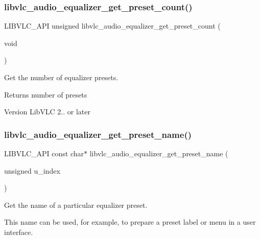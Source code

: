 \subsubsection{\texorpdfstring{libvlc\+\_\+audio\+\_\+equalizer\+\_\+get\+\_\+preset\+\_\+count()}{libvlc\_audio\_equalizer\_get\_preset\_count()}}
{\footnotesize\ttfamily L\+I\+B\+V\+L\+C\+\_\+\+A\+PI unsigned libvlc\+\_\+audio\+\_\+equalizer\+\_\+get\+\_\+preset\+\_\+count (\begin{DoxyParamCaption}\item[{void}]{ }\end{DoxyParamCaption})}

Get the number of equalizer presets.

\begin{DoxyReturn}{Returns}
number of presets 
\end{DoxyReturn}
\begin{DoxyVersion}{Version}
Lib\+V\+LC 2.. or later 
\end{DoxyVersion}
\mbox{\label{group__libvlc__audio_ga6d49eeb9252e31111054b2154ce54ced}} 
\subsubsection{\texorpdfstring{libvlc\+\_\+audio\+\_\+equalizer\+\_\+get\+\_\+preset\+\_\+name()}{libvlc\_audio\_equalizer\_get\_preset\_name()}}
{\footnotesize\ttfamily L\+I\+B\+V\+L\+C\+\_\+\+A\+PI const char$\ast$ libvlc\+\_\+audio\+\_\+equalizer\+\_\+get\+\_\+preset\+\_\+name (\begin{DoxyParamCaption}\item[{unsigned}]{u\+\_\+index }\end{DoxyParamCaption})}

Get the name of a particular equalizer preset.

This name can be used, for example, to prepare a preset label or menu in a user interface.


